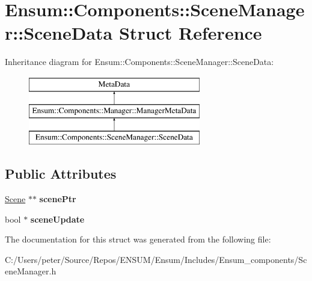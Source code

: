 \hypertarget{struct_ensum_1_1_components_1_1_scene_manager_1_1_scene_data}{}\section{Ensum\+:\+:Components\+:\+:Scene\+Manager\+:\+:Scene\+Data Struct Reference}
\label{struct_ensum_1_1_components_1_1_scene_manager_1_1_scene_data}
Inheritance diagram for Ensum\+:\+:Components\+:\+:Scene\+Manager\+:\+:Scene\+Data\+:\begin{figure}[H]
\begin{center}
\leavevmode
\includegraphics[height=3.000000cm]{struct_ensum_1_1_components_1_1_scene_manager_1_1_scene_data}
\end{center}
\end{figure}
\subsection*{Public Attributes}
\begin{DoxyCompactItemize}
\item 
\hyperlink{class_ensum_1_1_components_1_1_scene}{Scene} $\ast$$\ast$ {\bfseries scene\+Ptr}\hypertarget{struct_ensum_1_1_components_1_1_scene_manager_1_1_scene_data_ac37964615c53887051adcc587fa9dab0}{}\label{struct_ensum_1_1_components_1_1_scene_manager_1_1_scene_data_ac37964615c53887051adcc587fa9dab0}

\item 
bool $\ast$ {\bfseries scene\+Update}\hypertarget{struct_ensum_1_1_components_1_1_scene_manager_1_1_scene_data_a7d4a9e3d7aed5dc8f338b4d4a312f875}{}\label{struct_ensum_1_1_components_1_1_scene_manager_1_1_scene_data_a7d4a9e3d7aed5dc8f338b4d4a312f875}

\end{DoxyCompactItemize}


The documentation for this struct was generated from the following file\+:\begin{DoxyCompactItemize}
\item 
C\+:/\+Users/peter/\+Source/\+Repos/\+E\+N\+S\+U\+M/\+Ensum/\+Includes/\+Ensum\+\_\+components/Scene\+Manager.\+h\end{DoxyCompactItemize}
